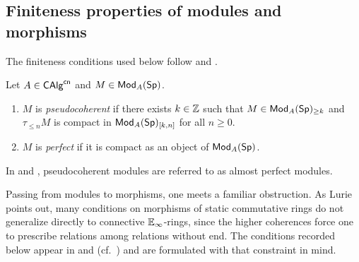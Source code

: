 \subsection{Finiteness properties of modules and morphisms}\label{subsec: finiteness properties}
The finiteness conditions used below follow \cite[\S 7.2]{HA} and \cite[\S 4]{SAG}. 
\begin{definition}\label{def: finiteness properties of modules}
    Let $A\in\mathsf{CAlg}^{\mathsf{cn}}$ and $M\in\mathsf{Mod}_{A}(\mathsf{Sp})$. 
    \begin{enumerate}
        \item $M$ is \emph{pseudocoherent} if there exists $k\in\mathbb{Z}$ such that $M\in\mathsf{Mod}_{A}(\mathsf{Sp})_{\geq k}$ and $\tau_{\leq n}M$ is compact in $\mathsf{Mod}_{A}(\mathsf{Sp})_{[k,n]}$ for all $n\geq0$. 
        \item $M$ is \emph{perfect} if it is compact as an object of $\mathsf{Mod}_{A}(\mathsf{Sp})$. 
    \end{enumerate}
\end{definition} 
\begin{remark}\label{rmk: pseudocoherent and almost perfect}
    In \cite[\S 7]{HA} and \cite{SAG}, pseudocoherent modules are referred to as almost perfect modules. 
\end{remark}
Passing from modules to morphisms, one meets a familiar obstruction. As Lurie points out, many conditions on morphisms of static commutative rings do not generalize directly to connective $\mathbb{E}_{\infty}$-rings, since the higher coherences force one to prescribe relations among relations without end. The conditions recorded below appear in \cite[\S 7.2.4]{HA} and \cite[\S 4.1 \& \S 5.2]{SAG} (cf.\ \cite[Rmk. 5.2.0.2]{SAG}) and are formulated with that constraint in mind.
